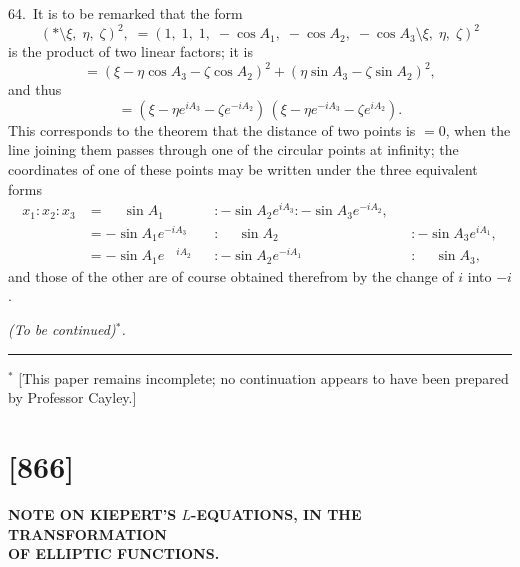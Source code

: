 \documentclass[12pt,a4paper]{article}
\theoremstyle{definition}
\begin{document}
64.\ It is to be remarked that the form
\[
(*\!\mathbin{\!\!\setminus\!\!}\xi,\; \eta,\; \zeta)^2,
\; = (1,\; 1,\; 1,\; -\cos A_1,\; -\cos A_2,\; -\cos A_3 \!\mathbin{\!\!\setminus\!\!}\xi,\; \eta,\; \zeta)^2
\]
is the product of two linear factors; it is
\[
= (\xi - \eta \cos A_3 - \zeta \cos A_2)^2 + (\eta \sin A_3 - \zeta \sin A_2)^2,
\]
and thus
\[
= (\xi - \eta e^{iA_3} - \zeta e^{-iA_2})\,
(\xi - \eta e^{-iA_3} - \zeta e^{iA_2}).
\]
This corresponds to the theorem that the distance of two points is $= 0$, when the line
joining them passes through one of the circular points at infinity; the coordinates of
one of these points may be written under the three equivalent forms
\begin{align*}
x_1 : x_2 : x_3 &= \phantom{-}\sin A_1 && : -\sin A_2 e^{iA_3} : -\sin A_3 e^{-iA_2},\\
&= -\sin A_1 e^{-iA_3} && : \phantom{-}\sin A_2 && : -\sin A_3 e^{iA_1},\\
&= -\sin A_1 e^{\phantom{-}iA_2} && : -\sin A_2 e^{-iA_1} && : \phantom{-}\sin A_3,
\end{align*}
and those of the other are of course obtained therefrom by the change of $i$ into $-i$.

\begin{flushright}
\textit{(To be continued)$^*$.}
\end{flushright}

\vspace{1em}
\noindent\rule{0.4\textwidth}{0.4pt}

\smallskip
\noindent $^*$ [This paper remains incomplete; no continuation appears to have been prepared by Professor Cayley.]

\newpage
\section*{[866]}
\begin{center}
\large\textbf{NOTE ON KIEPERT'S $L$-EQUATIONS, IN THE TRANSFORMATION\\OF ELLIPTIC FUNCTIONS.}
\end{center}

\begin{flushright}
\end{flushright}
\end{document}
